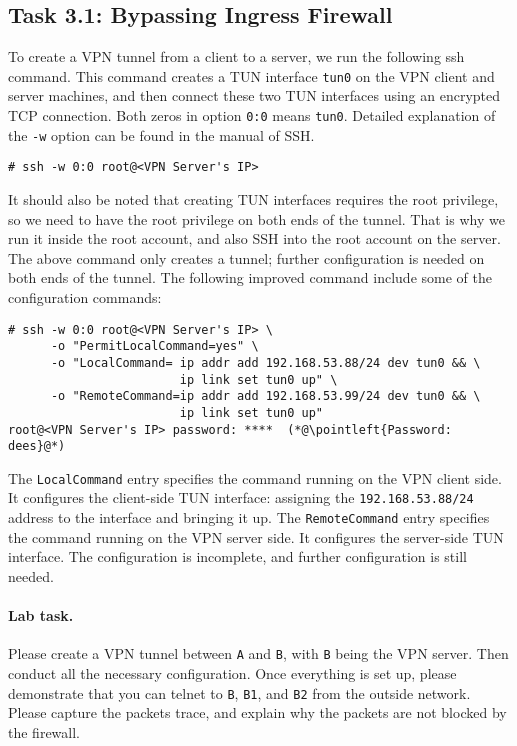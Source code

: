 \subsection{Task 3.1: Bypassing Ingress Firewall} 
 
To create a VPN tunnel from a client to a server, we run the following
ssh command. This command creates a TUN interface \texttt{tun0} on
the VPN client and server machines, and then connect these
two TUN interfaces using an encrypted TCP connection.
Both zeros in option \texttt{0:0} means \texttt{tun0}.
Detailed explanation of the \texttt{-w} option can be found
in the manual of SSH.

\begin{lstlisting}
# ssh -w 0:0 root@<VPN Server's IP>
\end{lstlisting}

It should also be noted that creating TUN interfaces requires the root
privilege, so we need to have the root privilege on both
ends of the tunnel. That is why we run it inside the root account,
and also SSH into the root account on the server.
The above command only creates a tunnel; further configuration
is needed on both ends of the tunnel. The following 
improved command include some of the configuration commands:

\begin{lstlisting}
# ssh -w 0:0 root@<VPN Server's IP> \
      -o "PermitLocalCommand=yes" \
      -o "LocalCommand= ip addr add 192.168.53.88/24 dev tun0 && \
                        ip link set tun0 up" \
      -o "RemoteCommand=ip addr add 192.168.53.99/24 dev tun0 && \
                        ip link set tun0 up"
root@<VPN Server's IP> password: ****  (*@\pointleft{Password: dees}@*)
\end{lstlisting}

The \texttt{LocalCommand} entry specifies the command running on the VPN client side.
It configures the client-side TUN interface:
assigning the \texttt{192.168.53.88/24} address to the interface and bringing it up.
The \texttt{RemoteCommand} entry specifies the command running
on the VPN server side.
It configures the server-side TUN interface. 
The configuration is incomplete, and further configuration is still needed. 

\paragraph{Lab task.}
Please create a VPN tunnel between \texttt{A} and \texttt{B}, with
\texttt{B} being the VPN server. Then conduct all the necessary
configuration. Once everything is set up, please demonstrate that 
you can telnet to \texttt{B}, \texttt{B1}, and \texttt{B2} from the outside network. 
Please capture the packets trace, and explain why the packets are 
not blocked by the firewall. 



